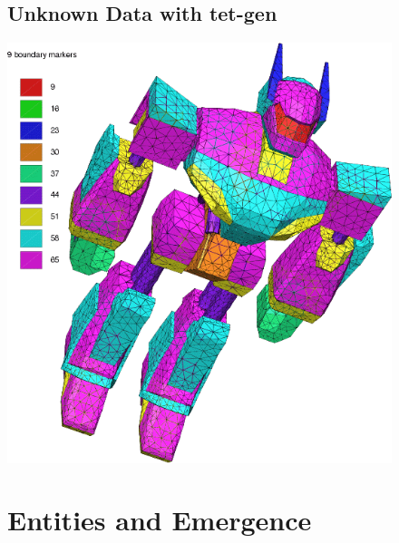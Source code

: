 \documentclass[11pt]{article}
\begin{document}
\begin{itemize}
\begin{figure}[htp]
\subsection{Unknown Data with tet-gen}
\includegraphics[scale=0.3]{image/unknow-robot.png}
\end{figure}

\begin{itemize}
\begin{figure}[htp]
\section{Entities and Emergence}



\end{figure}
\end{itemize}
\end{itemize}
\end{document}
